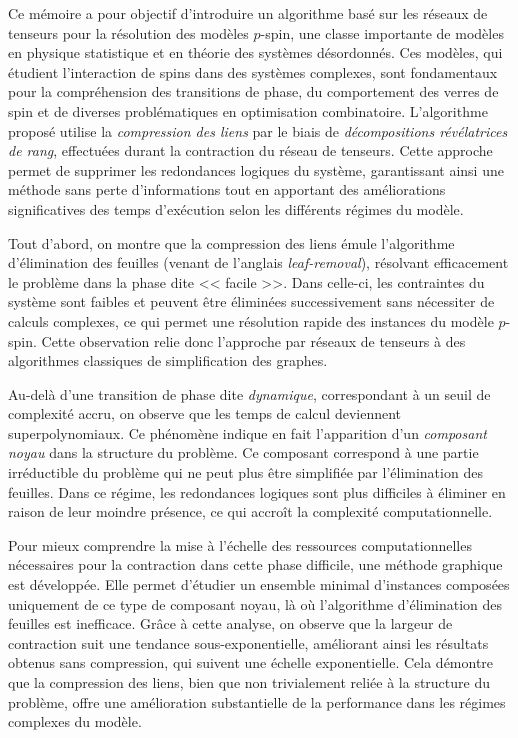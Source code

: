 \begin{comment}
\end{comment}

Ce mémoire a pour objectif d'introduire un algorithme basé sur les réseaux de tenseurs pour la résolution des modèles $p$-spin, une classe importante de modèles en physique statistique et en théorie des systèmes désordonnés.
Ces modèles, qui étudient l'interaction de spins dans des systèmes complexes, sont fondamentaux pour la compréhension des transitions de phase, du comportement des verres de spin et de diverses problématiques en optimisation combinatoire.
L'algorithme proposé utilise la \emph{compression des liens} par le biais de \emph{décompositions révélatrices de rang}, effectuées durant la contraction du réseau de tenseurs.
Cette approche permet de supprimer les redondances logiques du système, garantissant ainsi une méthode sans perte d'informations tout en apportant des améliorations significatives des temps d'exécution selon les différents régimes du modèle.

Tout d'abord, on montre que la compression des liens émule l'algorithme d'élimination des feuilles (venant de l'anglais \textit{leaf-removal}), résolvant efficacement le problème dans la phase dite << facile >>.
Dans celle-ci, les contraintes du système sont faibles et peuvent être éliminées successivement sans nécessiter de calculs complexes, ce qui permet une résolution rapide des instances du modèle $p$-spin.
Cette observation relie donc l'approche par réseaux de tenseurs à des algorithmes classiques de simplification des graphes.

Au-delà d'une transition de phase dite \emph{dynamique}, correspondant à un seuil de complexité accru, on observe que les temps de calcul deviennent superpolynomiaux.
Ce phénomène indique en fait l'apparition d'un \emph{composant noyau} dans la structure du problème.
Ce composant correspond à une partie irréductible du problème qui ne peut plus être simplifiée par l'élimination des feuilles.
Dans ce régime, les redondances logiques sont plus difficiles à éliminer en raison de leur moindre présence, ce qui accroît la complexité computationnelle.

Pour mieux comprendre la mise à l'échelle des ressources computationnelles nécessaires pour la contraction dans cette phase difficile, une méthode graphique est développée.
Elle permet d'étudier un ensemble minimal d'instances composées uniquement de ce type de composant noyau, là où l'algorithme d'élimination des feuilles est inefficace.
Grâce à cette analyse, on observe que la largeur de contraction suit une tendance sous-exponentielle, améliorant ainsi les résultats obtenus sans compression, qui suivent une échelle exponentielle.
Cela démontre que la compression des liens, bien que non trivialement reliée à la structure du problème, offre une amélioration substantielle de la performance dans les régimes complexes du modèle.

